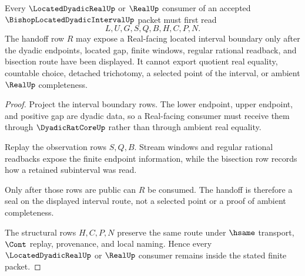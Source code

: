 \begin{theorem}
\label{thm:bishop-located-dyadic-interval-real-handoff}
Every $\LocatedDyadicRealUp$ or $\RealUp$ consumer of an accepted $\BishopLocatedDyadicIntervalUp$ packet must first read
$$
L,U,G,S,Q,B,H,C,P,N .
$$
The handoff row $R$ may expose a Real-facing located interval boundary only after the dyadic endpoints, located gap, finite windows, regular rational readback, and bisection route have been displayed. It cannot export quotient real equality, countable choice, detached trichotomy, a selected point of the interval, or ambient $\RealUp$ completeness.
\end{theorem}
\begin{proof}
Project the interval boundary rows. The lower endpoint, upper endpoint, and positive gap are dyadic data, so a Real-facing consumer must receive them through $\DyadicRatCoreUp$ rather than through ambient real equality.

Replay the observation rows $S,Q,B$. Stream windows and regular rational readbacks expose the finite endpoint information, while the bisection row records how a retained subinterval was read.

Only after those rows are public can $R$ be consumed. The handoff is therefore a seal on the displayed interval route, not a selected point or a proof of ambient completeness.

The structural rows $H,C,P,N$ preserve the same route under $\hsame$ transport, $\Cont$ replay, provenance, and local naming. Hence every $\LocatedDyadicRealUp$ or $\RealUp$ consumer remains inside the stated finite packet.
\end{proof}




